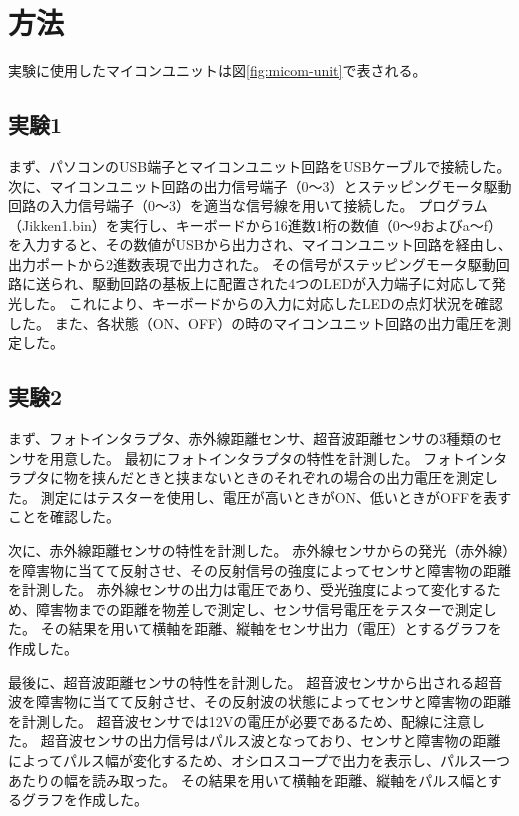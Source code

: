 \documentclass[../../../main]{subfiles}
\begin{document}
\section{方法}
実験に使用したマイコンユニットは図\ref{fig:micom-unit}で表される。


\subsection{実験1}
まず、パソコンのUSB端子とマイコンユニット回路をUSBケーブルで接続した。
次に、マイコンユニット回路の出力信号端子（0～3）とステッピングモータ駆動回路の入力信号端子（0～3）を適当な信号線を用いて接続した。
プログラム（Jikken1.bin）を実行し、キーボードから16進数1桁の数値（0～9およびa～f）を入力すると、その数値がUSBから出力され、マイコンユニット回路を経由し、出力ポートから2進数表現で出力された。
その信号がステッピングモータ駆動回路に送られ、駆動回路の基板上に配置された4つのLEDが入力端子に対応して発光した。
これにより、キーボードからの入力に対応したLEDの点灯状況を確認した。
また、各状態（ON、OFF）の時のマイコンユニット回路の出力電圧を測定した。

\subsection{実験2}
まず、フォトインタラプタ、赤外線距離センサ、超音波距離センサの3種類のセンサを用意した。
最初にフォトインタラプタの特性を計測した。
フォトインタラプタに物を挟んだときと挟まないときのそれぞれの場合の出力電圧を測定した。
測定にはテスターを使用し、電圧が高いときがON、低いときがOFFを表すことを確認した。

次に、赤外線距離センサの特性を計測した。
赤外線センサからの発光（赤外線）を障害物に当てて反射させ、その反射信号の強度によってセンサと障害物の距離を計測した。
赤外線センサの出力は電圧であり、受光強度によって変化するため、障害物までの距離を物差しで測定し、センサ信号電圧をテスターで測定した。
その結果を用いて横軸を距離、縦軸をセンサ出力（電圧）とするグラフを作成した。

最後に、超音波距離センサの特性を計測した。
超音波センサから出される超音波を障害物に当てて反射させ、その反射波の状態によってセンサと障害物の距離を計測した。
超音波センサでは12Vの電圧が必要であるため、配線に注意した。
超音波センサの出力信号はパルス波となっており、センサと障害物の距離によってパルス幅が変化するため、オシロスコープで出力を表示し、パルス一つあたりの幅を読み取った。
その結果を用いて横軸を距離、縦軸をパルス幅とするグラフを作成した。
\end{document}
